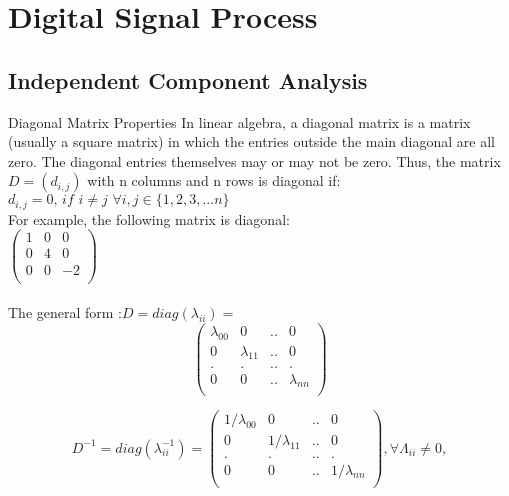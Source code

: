 \chapter{Digital Signal Process} %

\label{Chapter3} %


\section{Independent Component Analysis}
\begin{compactitem}

\item Diagonal Matrix Properties
In linear algebra, a diagonal matrix is a matrix (usually a square matrix) in which 
the entries outside the main diagonal are all zero. The diagonal entries themselves 
may or may not be zero. Thus, the matrix $D = (d_{i,j})$ with n columns and n rows is diagonal 
if:
$d_{i,j}=0,\, if \,\, i \neq j \,\, \forall i,j \in \{1,2,3,...n\} $
\\For example, the following matrix is diagonal:\\
$\begin{pmatrix}
       1	&0 	&0	\\[0.3em]
       0 	&4 	&0 	\\[0.3em]
       0 	& 0 	&-2	\\[0.3em]
\end{pmatrix}
$ \cite{wiki-Diagonal_matrix}
\\
\\The general form :$D=diag(\lambda_{ii}) =$
\begin{equation}
\label{eq:diagm}
\begin{pmatrix}
       \lambda_{00}& 0 				& ..	&	0 	\\[0.3em]
       0 			& \lambda_{11} & ..		&	0 	\\[0.3em]
       .			& .				& ..	&	.	\\[0.3em]
       0 			& 0 			& ..	&	\lambda_{nn}\\[0.3em]
     \end{pmatrix}
\end{equation}

\begin{equation}
\label{eq:pdpD}
D^{-1}=diag(\lambda_{ii}^{-1})=
\begin{pmatrix}
       1/\lambda_{00}& 0 				& ..	&	0 	\\[0.3em]
       0 			& 1/\lambda_{11} & ..		&	0 	\\[0.3em]
       .			& .				& ..	&	.	\\[0.3em]
       0 			& 0 			& ..	&	1/\lambda_{nn}\\[0.3em]
\end{pmatrix}
, \forall \Lambda_{ii} \neq 0,
\end{equation}\\


\end{compactitem}
